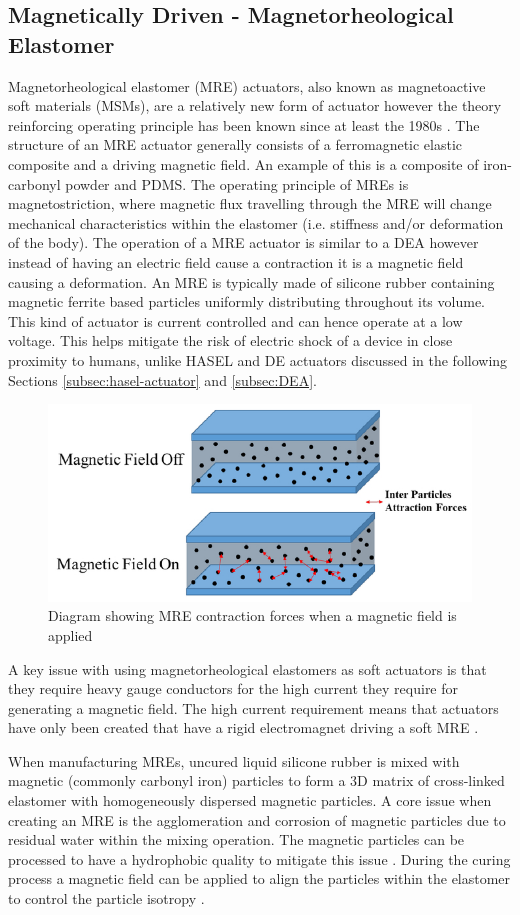 \subsection{Magnetically Driven - Magnetorheological Elastomer}
Magnetorheological elastomer (MRE) actuators, also known as magnetoactive soft materials (MSMs), are a relatively new form of actuator however the theory reinforcing operating principle has been known since at least the 1980s \citep{Jolly1996}. The structure of an MRE actuator generally consists of a ferromagnetic elastic composite and a driving magnetic field. An example of this is a composite of iron-carbonyl powder and PDMS. The operating principle of MREs is magnetostriction, where magnetic flux travelling through the MRE will change mechanical characteristics within the elastomer (i.e. stiffness and/or deformation of the body). The operation of a MRE actuator is similar to a DEA however instead of having an electric field cause a contraction it is a magnetic field causing a deformation. An MRE is typically made of silicone rubber containing magnetic ferrite based particles uniformly distributing throughout its volume. This kind of actuator is current controlled and can hence operate at a low voltage. This helps mitigate the risk of electric shock of a device in close proximity to humans, unlike HASEL and DE actuators discussed in the following Sections \ref{subsec:hasel-actuator} and \ref{subsec:DEA}.
\begin{figure}[H]
  \centering
  \includegraphics[width=0.6\linewidth]{Figures/MRE_actuate.jpg} %
  \caption{Diagram showing MRE contraction forces when a magnetic field is applied \citep{Park2018a}}
  \label{fig:Artificial Muscle_MRE}
\end{figure}
A key issue with using magnetorheological elastomers as soft actuators is that they require heavy gauge conductors for the high current they require for generating a magnetic field. The high current requirement means that actuators have only been created that have a rigid electromagnet driving a soft MRE \citep{Bose2012}. 

When manufacturing MREs, uncured liquid silicone rubber is mixed with magnetic (commonly carbonyl iron) particles to form a 3D matrix of cross-linked elastomer with homogeneously dispersed magnetic particles. A core issue when creating an MRE is the agglomeration and corrosion of magnetic particles due to residual water within the mixing operation. The magnetic particles can be processed to have a hydrophobic quality to mitigate this issue \cite{Burhannuddin2020,Ge2020}. During the curing process a magnetic field can be applied to align the particles within the elastomer to control the particle isotropy \cite{Ge2020,LaleganiDezaki2023}.

